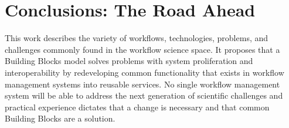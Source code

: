 \section{Conclusions: The Road Ahead}

This work describes the variety of workflows, technologies, problems, and challenges commonly found in the workflow science space. It proposes that a Building Blocks model solves problems with system proliferation and interoperability by redeveloping common functionality that exists in workflow management systems into reusable services. No single workflow management system will be able to address the next generation of scientific challenges and practical experience dictates that a change is necessary and that common Building Blocks are a solution.

